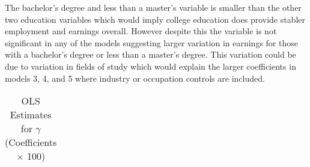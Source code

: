 \documentclass[12pt]{article}
\begin{document}
\begin{onehalfspace}
The bachelor's degree and less than a master's variable is smaller than the other two education variables which would imply college education does provide stabler employment and earnings overall. However despite this the variable is not significant in any of the models suggesting larger variation in earnings for those with a bachelor's degree or less than a master's degree. This variation could be due to variation in fields of study which would explain the larger coefficients in models 3, 4, and 5 where industry or occupation controls are included.


\end{onehalfspace}


\begin{table}[H]
\centering
\caption{OLS Estimates for $\gamma$ (Coefficients $\times$ 100)}

\begin{tabular}{lccccc}


\end{tabular}
\end{table}
\end{document}
